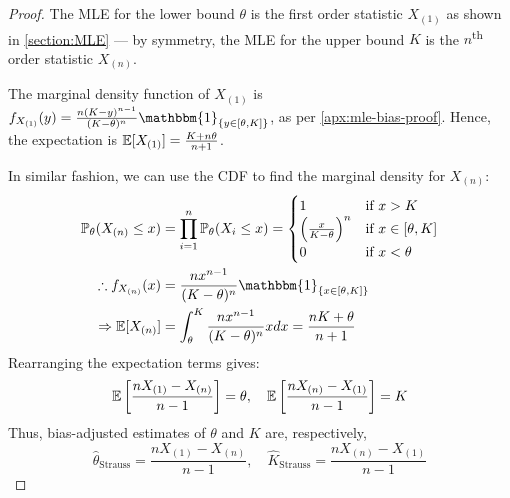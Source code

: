 
\begin{proof}
    The MLE for the lower bound $\theta$ is the first order statistic $X_{(1)}$ as shown in \autoref{section:MLE} --- by symmetry, the MLE for the upper bound $K$ is the $n$\textsuperscript{th} order statistic $X_{(n)}$.

    The marginal density function of $X_{(1)}$ is $f_{X_{(1)}}(y) = \frac{n(K-y)^{n-1}}{(K-\theta)^n} \mathbbm{1}_{\left\{ y \in [\theta, K] \right\}}$, as per \autoref{apx:mle-bias-proof}. Hence, the expectation is $\mathbb{E}[X_{(1)}] = \frac{K +n\theta}{n+1}$.
    
    In similar fashion, we can use the CDF to find the marginal density for $X_{(n)}$:
    \begin{align*}
        \PP_\theta (X_{(n)} \leq x) &= \prod_{i=1}^n \PP_\theta (X_i \leq x) = \begin{cases}
            1 & \text{if $x > K$}  \\
            \left(\frac{x}{K-\theta}\right)^n & \text{if $x \in [\theta, K]$}  \\
            0 & \text{if $x < \theta$}  \\
        \end{cases} \\
        \therefore f_{X_{(n)}}(x) &=\frac{n x^{n-1}}{(K-\theta)^n} \mathbbm{1}_{\left\{ x \in [\theta, K] \right\}} \\
        \implies \E[X_{(n)}] &= \int_\theta^K \frac{n x^{n-1}}{(K-\theta)^n} x dx = \frac{nK + \theta}{n+1}
    \end{align*}
    Rearranging the expectation terms gives:
    \[
        \mathbb{E}\left[\frac{nX_{(1)} - X_{(n)}}{n-1}\right] = \theta, \quad 
        \mathbb{E}\left[\frac{nX_{(n)} - X_{(1)}}{n-1}\right] = K
    \]
    Thus, bias-adjusted estimates of $\theta$ and $K$ are, respectively,\[
    \hat\theta_{\text{Strauss}} = \frac{nX_{(1)} - X_{(n)}}{n-1}, \quad
    \hat{K}_{\text{Strauss}} = \frac{nX_{(n)} - X_{(1)}}{n-1}
    \]
\end{proof}